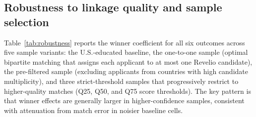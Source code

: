 


\subsection{Robustness to linkage quality and sample selection}

Table~\ref{tab:robustness} reports the winner coefficient for all six outcomes across five sample variants: the U.S.-educated baseline, the one-to-one sample (optimal bipartite matching that assigns each applicant to at most one Revelio candidate), the pre-filtered sample (excluding applicants from countries with high candidate multiplicity), and three strict-threshold samples that progressively restrict to higher-quality matches (Q25, Q50, and Q75 score thresholds). The key pattern is that winner effects are generally larger in higher-confidence samples, consistent with attenuation from match error in noisier baseline cells.

